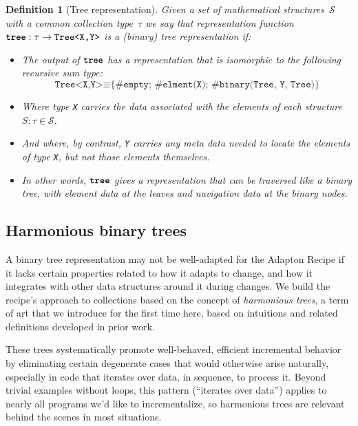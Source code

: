 \documentclass[11pt]{article}
\renewcommand{\ottkw}[1]{\textbf{\texttt{#1}}}
\newtheorem{definition}{Definition}
\begin{document}
\begin{definition}[Tree representation]
  Given a set of mathematical structures~$\mathcal{S}$ with a common
  collection type~$\tau$ we say that
  representation function $\ottkw{tree} : \tau \rightarrow \texttt{Tree<X,Y>}$ is a
  \emph{(binary) tree representation} if:
  \begin{itemize}
  \item The output of $\ottkw{tree}$ has a representation that is isomorphic to the
    following recursive sum type:
    \[
    \texttt{Tree<X,Y>} \equiv \texttt{\{\#empty; \#elment(X); \#binary(Tree, Y, Tree)\}}
    \]
  \item Where type \texttt{X} carries the data associated with the elements of each structure~$S : \tau \in \mathcal{S}$.
    
  \item And where, by contrast, \texttt{Y}
    carries any \emph{meta data} needed to \emph{locate} the elements of type \texttt{X},
    but \emph{not} those elements themselves.

  \item In other words, $\ottkw{tree}$ gives a representation that can
    be traversed like a binary tree, with element data at the leaves
    and navigation data at the binary nodes.
    
  \end{itemize}
\end{definition}

\subsection{Harmonious binary trees}

A binary tree representation may not be well-adapted for the Adapton Recipe if it
lacks certain properties related to how it adapts to change, and
how it integrates with other data structures around it during changes.
%
We build the recipe's approach to collections based on the concept of \emph{harmonious trees},
a term of art that we introduce for the first time here, based on
intuitions and related definitions developed in prior work.

These trees systematically promote well-behaved, efficient incremental
behavior by eliminating certain degenerate cases that would otherwise
arise naturally, especially in code that iterates over data, in
sequence, to process it.
%
Beyond trivial examples without loops, this pattern (``iterates over
data'') applies to nearly all programs we'd like to incrementalize, so
harmonious trees are relevant behind the scenes in most situations.
\end{document}
